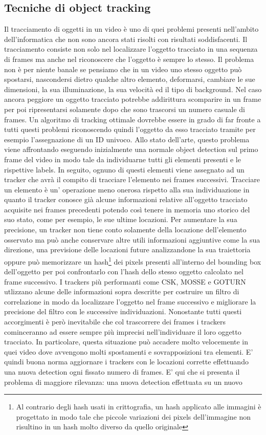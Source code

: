 \subsection{Tecniche di object tracking}
Il tracciamento di oggetti in un video è uno di quei problemi presenti nell'ambito dell'informatica che non sono ancora stati risolti con risultati soddisfacenti. Il tracciamento consiste non solo nel localizzare l'oggetto tracciato in una sequenza di frames ma anche nel riconoscere che l'oggetto è sempre lo stesso. Il problema non è per niente banale se pensiamo che in un video uno stesso oggetto può spostarsi, nascondersi dietro qualche altro elemento, deformarsi, cambiare le sue dimensioni, la sua illuminazione, la sua velocità ed il tipo di background. Nel caso ancora peggiore un oggetto tracciato potrebbe addirittura scomparire in un frame per poi ripresentarsi solamente dopo che sono trascorsi un numero casuale di frames. Un algoritmo di tracking ottimale dovrebbe essere in grado di far fronte a tutti questi problemi riconoscendo quindi l'oggetto da esso tracciato tramite per esempio l'assegnazione di un ID univoco. Allo stato dell'arte, questo problema viene affrontando eseguendo inizialmente una normale object detection sul primo frame del video in modo tale da individuarne tutti gli elementi presenti e le rispettive labels. In seguito, ognuno di questi elementi viene assegnato ad un tracker che avrà il compito di tracciare l'elemento nei frames successivi. Tracciare un elemento è un' operazione meno onerosa rispetto alla sua individuazione in quanto il tracker conosce già alcune informazioni relative all'oggetto tracciato acquisite nei frames precedenti potendo così tenere in memoria uno storico del suo stato, come per esempio, le sue ultime locazioni. Per aumentare la sua precisione, un tracker non tiene conto solamente della locazione dell'elemento  osservato ma può anche conservare altre utili informazioni aggiuntive come la sua direzione, una previsione delle locazioni future analizzandone la sua traiettoria oppure può memorizzare un hash\footnote{Al contrario degli hash usati in crittografia, un hash applicato alle immagini è progettato in modo tale che piccole variazioni dei pixels dell'immagine non risultino in un hash molto diverso da quello originale} dei pixels presenti all'interno del bounding box dell'oggetto per poi confrontarlo con l'hash dello stesso oggetto calcolato nel frame successivo. I trackers più performanti come CSK, MOSSE e GOTURN utlizzano alcune delle informazioni sopra descritte per costruire un filtro di correlazione in modo da localizzare l'oggetto nel frame successivo e migliorare la precisione del filtro con le successive individuazioni. Nonostante tutti questi accorgimenti è però inevitabile che col trascorrere dei frames i trackers cominceranno ad essere sempre più imprecisi nell'individuare il loro oggetto tracciato. In particolare, questa situazione può accadere molto velocemente in quei video dove avvengono molti spostamenti e sovrapposizioni tra elementi. E' quindi buona norma aggiornare i trackers con le locazioni corrette effettuando una nuova detection ogni fissato numero di frames. E' qui che si presenta il problema di maggiore rilevanza: una nuova detection effettuata su un nuovo 